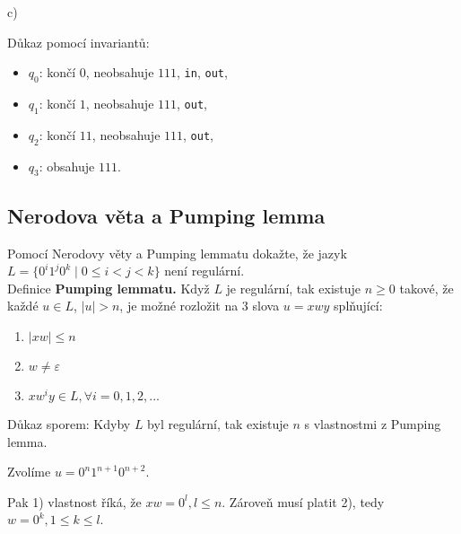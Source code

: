 \noindent
c)


Důkaz pomocí invariantů: 
\begin{itemize}[noitemsep]
    \item $q_0$: končí $0$, neobsahuje $111$, \texttt{in}, \texttt{out},
    \item $q_1$: končí $1$, neobsahuje $111$, \texttt{out},
    \item $q_2$: končí $11$, neobsahuje $111$, \texttt{out},
    \item $q_3$: obsahuje $111$. 
\end{itemize}

\subsection{Nerodova věta a Pumping lemma}
Pomocí Nerodovy věty a Pumping lemmatu dokažte, že jazyk $L = \{0^i 1^j 0^k \mid 0 \leq i < j <k\}$ není regulární.\\

\noindent
Definice \textbf{Pumping lemmatu.} Když $L$ je regulární, tak existuje $n \geq 0$ takové, že každé ${u \in L}$,
$|u| > n$, je možné rozložit na 3 slova $u = xwy$ splňující:

\begin{enumerate}[1), noitemsep]
    \item $|xw| \leq n$
    \item $w \not= \varepsilon$
    \item $xw^i y \in L, \forall i = 0, 1, 2, ...$
\end{enumerate}
Důkaz sporem:
Kdyby $L$ byl regulární, tak existuje $n$ s vlastnostmi z Pumping lemma.

Zvolíme $u = 0^n 1^{n+1} 0^{n+2}$.

Pak 1) vlastnost říká, že $xw = 0^l, l \leq n$. Zároveň musí platit 2), tedy $w = 0^k, 1 \leq k \leq l$.

